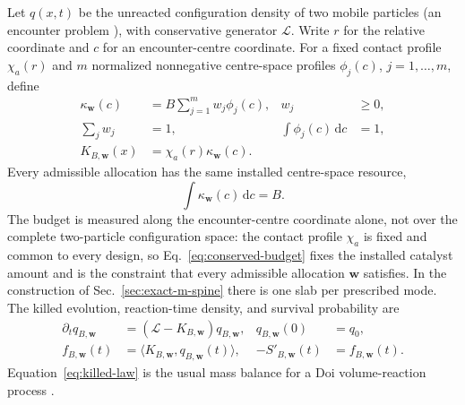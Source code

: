 \documentclass[aps,physrev,reprint,amsmath,amssymb,longbibliography,floatfix]{revtex4-2}
\newcommand{\dd}{\mathrm d}
\begin{document}
Let \(q(x,t)\) be the unreacted configuration density of two mobile
particles (an encounter problem
\cite{giuggioliPerezBeckerSanders2013,leVotEtAl2022encounter}), with
conservative generator \(\mathcal L\).  Write \(r\) for the
relative coordinate and \(c\) for an encounter-centre coordinate.  For a
fixed contact profile \(\chi_a(r)\) and \(m\) normalized nonnegative
centre-space profiles \(\phi_j(c)\), \(j=1,\ldots,m\), define
\begin{align}
 \kappa_{\bm w}(c)&=B\sum_{j=1}^{m}w_j\phi_j(c),
 &w_j&\ge0,\nonumber\\
 \sum_jw_j&=1,
 &\int\phi_j(c)\,\dd c&=1,\nonumber\\
 K_{B,\bm w}(x)&=\chi_a(r)\kappa_{\bm w}(c).
 \label{eq:budget-field}
\end{align}
Every admissible allocation has the same installed centre-space resource,
\begin{equation}
 \int\kappa_{\bm w}(c)\,\dd c=B.
 \label{eq:conserved-budget}
\end{equation}
The budget is measured along the encounter-centre coordinate alone, not over
the complete two-particle configuration space: the contact profile
\(\chi_a\) is fixed and common to every design, so
Eq.~\eqref{eq:conserved-budget} fixes the installed catalyst amount and is
the constraint that every admissible allocation \(\bm w\) satisfies.  In
the construction of Sec.~\ref{sec:exact-m-spine} there is one slab per
prescribed mode.
The killed evolution, reaction-time density, and survival probability are
\begin{align}
 \partial_tq_{B,\bm w}&=(\mathcal L-K_{B,\bm w})q_{B,\bm w},
 &q_{B,\bm w}(0)&=q_0,\nonumber\\
 f_{B,\bm w}(t)&=\langle K_{B,\bm w},q_{B,\bm w}(t)\rangle,
 &-S'_{B,\bm w}(t)&=f_{B,\bm w}(t).
 \label{eq:killed-law}
\end{align}
Equation~\eqref{eq:killed-law} is the usual mass balance for a Doi
volume-reaction process \cite{doi1976stochastic}.
\end{document}
